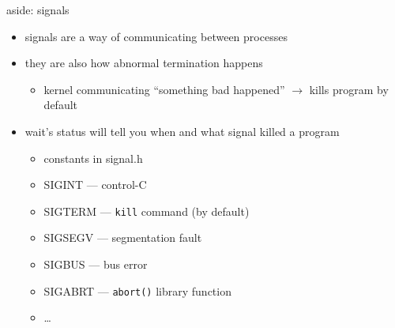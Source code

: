 \begin{frame}{aside: signals}
    \begin{itemize}
    \item signals are a way of communicating between processes
    \item they are also how abnormal termination happens
        \begin{itemize}
        \item kernel communicating ``something bad happened'' $\rightarrow$ kills program by default
        \end{itemize}
    \item wait's status will tell you when and what signal killed a program
        \begin{itemize}
        \item constants in signal.h
        \item SIGINT --- control-C
        \item SIGTERM --- \texttt{kill} command (by default)
        \item SIGSEGV --- segmentation fault
        \item SIGBUS --- bus error
        \item SIGABRT --- \texttt{abort()} library function
        \item \ldots
        \end{itemize}
    \end{itemize}
\end{frame}

